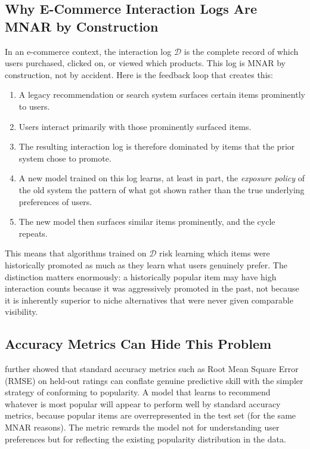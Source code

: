 \documentclass[11pt,a4paper]{report}
\begin{document}
\subsection*{Why E-Commerce Interaction Logs Are MNAR by Construction}

In an e-commerce context, the interaction log $\mathcal{D}$ is the complete record of which users purchased, clicked on, or viewed which products. This log is MNAR by construction, not by accident. Here is the feedback loop that creates this:

\begin{enumerate}
    \item A legacy recommendation or search system surfaces certain items prominently to users.
    \item Users interact primarily with those prominently surfaced items.
    \item The resulting interaction log is therefore dominated by items that the prior system chose to promote.
    \item A new model trained on this log learns, at least in part, the \emph{exposure policy} of the old system the pattern of what got shown rather than the true underlying preferences of users.
    \item The new model then surfaces similar items prominently, and the cycle repeats.
\end{enumerate}

This means that algorithms trained on $\mathcal{D}$ risk learning which items were historically promoted as much as they learn what users genuinely prefer. The distinction matters enormously: a historically popular item may have high interaction counts because it was aggressively promoted in the past, not because it is inherently superior to niche alternatives that were never given comparable visibility.

\subsection*{Accuracy Metrics Can Hide This Problem}

\citet{steck2011itempopularity} further showed that standard accuracy metrics such as Root Mean Square Error (RMSE) on held-out ratings can conflate genuine predictive skill with the simpler strategy of conforming to popularity. A model that learns to recommend whatever is most popular will appear to perform well by standard accuracy metrics, because popular items are overrepresented in the test set (for the same MNAR reasons). The metric rewards the model not for understanding user preferences but for reflecting the existing popularity distribution in the data.
\end{document}

